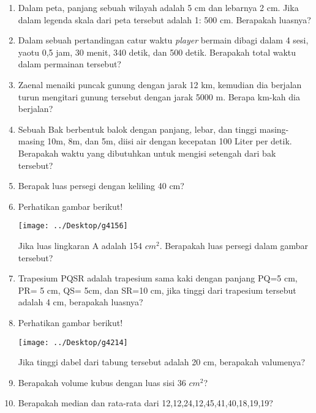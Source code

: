\documentclass[12pt,a4paper,twocolumn]{article}
\begin{document}
\begin{enumerate}
\begin{enumerate}
			\end{enumerate}
		\item Dalam peta, panjang sebuah wilayah adalah 5 cm dan lebarnya 2 cm. Jika dalam legenda skala dari peta tersebut adalah 1: 500 cm. Berapakah luasnya?
		\item Dalam sebuah pertandingan catur waktu \textit{player} bermain dibagi dalam 4 sesi, yaotu 0,5 jam, 30 menit, 340 detik, dan 500 detik. Berapakah total waktu dalam permainan tersebut?
		\item Zaenal menaiki puncak gunung  dengan jarak 12 km, kemudian dia berjalan turun mengitari gunung tersebut dengan jarak 5000 m. Berapa km-kah dia berjalan?
		\item Sebuah Bak berbentuk balok dengan panjang, lebar, dan tinggi masing-masing 10m, 8m, dan 5m, diisi air dengan kecepatan 100 Liter per detik. Berapakah waktu yang dibutuhkan untuk mengisi setengah dari bak tersebut?
		\item Berapak luas persegi dengan keliling 40 cm?
		\item Perhatikan gambar berikut!
		\begin{center}
			\texttt{[image: ../Desktop/g4156]}
		\end{center}
		Jika luas lingkaran A adalah 154 $cm^2$. Berapakah luas persegi dalam gambar tersebut?
		\item Trapesium PQSR adalah trapesium sama kaki dengan panjang PQ=5 cm, PR= 5 cm, QS= 5cm, dan SR=10 cm, jika tinggi dari trapesium tersebut adalah 4 cm, berapakah luasnya?
		\item Perhatikan gambar berikut!
		\begin{center}
			\texttt{[image: ../Desktop/g4214]}
		\end{center}
		Jika tinggi dabel dari tabung tersebut adalah 20 cm, berapakah valumenya? 
		\item Berapakah volume kubus dengan luas sisi 36 $cm^2$?
		\item Berapakah median dan rata-rata dari 12,12,24,12,45,41,40,18,19,19?
		
		
	\end{enumerate}
\end{document}
